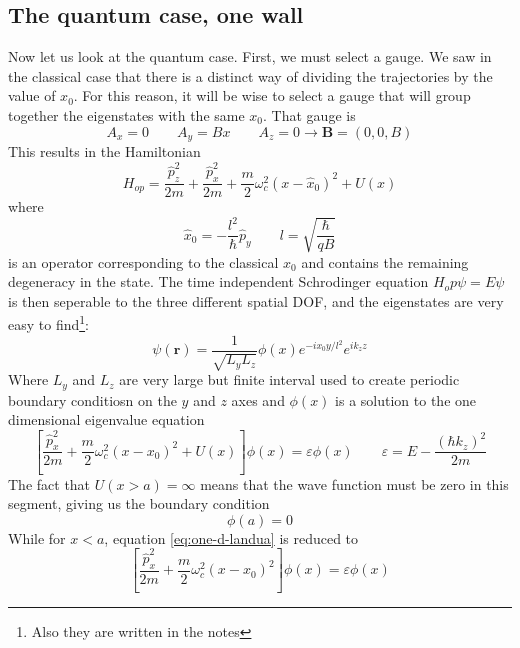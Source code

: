\documentclass{article}
\begin{document}
\subsection{The quantum case, one wall}
Now let us look at the quantum case. First, we must select a gauge. We saw in the classical case that there is a distinct way of dividing the trajectories by the value of $x_0$. For this reason, it will be wise to select a gauge that will group together the eigenstates with the same $x_0$. That gauge is
\begin{equation}
    A_x = 0 \qquad A_y = Bx \qquad A_z = 0 \rightarrow \boldsymbol{B} = (0, 0, B)
\end{equation}
This results in the Hamiltonian
\begin{equation}
    H_{op} = \frac{\hat{p}_z^2}{2m} + \frac{\hat{p}_x^2}{2m} + \frac{m}{2}\omega_c^2(x - \hat{x}_0)^2 + U(x)
\end{equation}
where
\begin{equation}
    \hat{x}_0 = -\frac{l^2}{\hbar}\hat{p}_y \qquad l = \sqrt{\frac{\hbar}{qB}}
\end{equation}
is an operator corresponding to the classical $x_0$ and contains the remaining degeneracy in the state. The time independent Schrodinger equation $H_op \psi = E\psi$ is then seperable to the three different spatial DOF, and the eigenstates are very easy to find\footnote{Also they are written in the notes}:
\begin{equation}
\label{eq:full-solution-1d}
    \psi(\boldsymbol{r}) = \frac{1}{\sqrt{L_yL_z}}\phi(x) e^{-ix_0y/l^2} e^{ik_zz}
\end{equation}
Where $L_y$ and $L_z$ are very large but finite interval used to create periodic boundary conditiosn on the $y$ and $z$ axes and $\phi(x)$ is a solution to the one dimensional eigenvalue equation
\begin{equation}
\label{eq:one-d-landua}
    \left[
        \frac{\hat{p}_x^2}{2m} + \frac{m}{2}\omega_c^2(x - x_0)^2 + U(x)
    \right]\phi(x) = \varepsilon \phi(x) \qquad \varepsilon = E - \frac{(\hbar k_z)^2}{2m}
\end{equation}
The fact that $U(x > a) = \infty$ means that the wave function must be zero in this segment, giving us the boundary condition
\begin{equation}
\label{eq:one-d-landau-boundary}
    \phi(a) = 0
\end{equation}
While for $x < a$, equation \ref{eq:one-d-landua} is reduced to
\begin{equation}
    \left[
        \frac{\hat{p}_x^2}{2m} + \frac{m}{2}\omega_c^2(x - x_0)^2
    \right]\phi(x) = \varepsilon \phi(x)
\end{equation}
\end{document}
